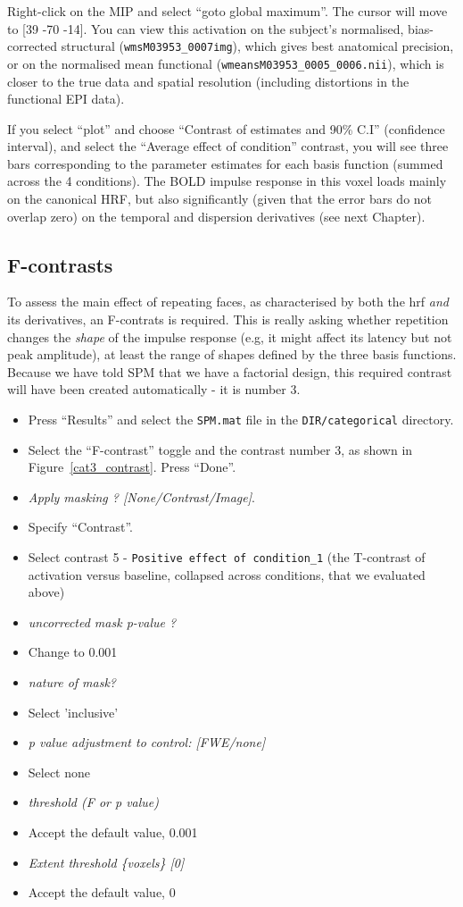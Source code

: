 Right-click on the MIP and select ``goto global maximum''. The cursor will move to [39 -70 -14]. You can view this activation on the subject's normalised, bias-corrected structural (\texttt{wmsM03953\_0007\.img}), which gives best anatomical precision, or on the normalised mean functional (\texttt{wmeansM03953\_0005\_0006.nii}), which is closer to the true data and spatial resolution (including distortions in the functional EPI data). 

If you select ``plot'' and choose ``Contrast of estimates and 90\% C.I'' (confidence interval), and select the ``Average effect of condition'' contrast, you will see three bars corresponding to the parameter estimates for each basis function (summed across the 4 conditions). The BOLD impulse response in this voxel loads mainly on the canonical HRF, but also significantly (given that the error bars do not overlap zero) on the temporal and dispersion derivatives (see next Chapter).

\subsection{F-contrasts}

To assess the main effect of repeating faces, as characterised by both the hrf \emph{and} its derivatives, an F-contrats is required. This is really asking whether repetition changes the \emph{shape} of the impulse response (e.g, it might affect its latency but not peak amplitude), at least the range of shapes defined by the three basis functions. Because we have told SPM that we have a factorial design, this required contrast will have been created automatically - it is number 3. 

\begin{itemize}
\item Press ``Results'' and select the \texttt{SPM.mat} file in the \texttt{DIR/categorical} directory.
\item Select the ``F-contrast'' toggle and the contrast number 3, as shown in Figure~\ref{cat3_contrast}. Press ``Done''.
\item \emph{Apply masking ? [None/Contrast/Image]}.
\item Specify ``Contrast''.
\item Select contrast 5 - \texttt{Positive effect of condition\_1} (the T-contrast of activation versus baseline, collapsed across conditions, that we evaluated above)
\item \emph{uncorrected mask p-value ?}
\item Change to 0.001
\item \emph{nature of mask?}
\item Select 'inclusive'
\item \emph{p value adjustment to control: [FWE/none]}
\item Select none
\item \emph{threshold (F or p value)}
\item Accept the default value, 0.001
\item \emph{Extent threshold \{voxels\} [0]}
\item Accept the default value, 0
\end{itemize}

